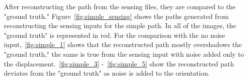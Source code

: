 \documentclass[a4paper,11pt]{report}
\begin{document}
	After reconstructing the path from the sensing files, they are compared to the "ground truth." Figure~\ref{fig:simple_sensing} shows the paths generated from reconstructing the sensing inputs for the simple path. In all of the images, the "ground truth" is represented in red. For the comparison with the no noise input,~\ref{fig:simple_1} shows that the reconstructed path mostly overshadows the "ground truth," the same is true from the sensing input with noise added only to the displacement.~\ref{fig:simple_3} -~\ref{fig:simple_5} show the reconstructed path deviates from the "ground truth" as noise is added to the orientation. 
	

	
	\begin{figure}[t!]
	\centering
	\\

\end{figure}
\end{document}
